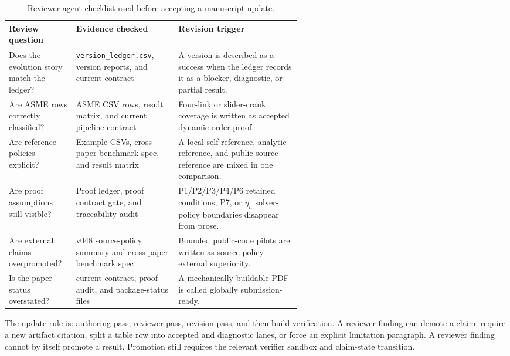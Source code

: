 \documentclass[10pt]{article}
\begin{document}
\begin{table}[H]
\centering
\caption{Reviewer-agent checklist used before accepting a manuscript update.}
\label{tab:review_agent}
\small
\begin{tabularx}{\linewidth}{p{0.23\linewidth}p{0.35\linewidth}Y}
\toprule
\textbf{Review question} & \textbf{Evidence checked} & \textbf{Revision trigger} \\
\midrule
Does the evolution story match the ledger? & \texttt{version\_ledger.csv}, version reports, and current contract & A version is described as a success when the ledger records it as a blocker, diagnostic, or partial result. \\
Are ASME rows correctly classified? & ASME CSV rows, result matrix, and current pipeline contract & Four-link or slider-crank coverage is written as accepted dynamic-order proof. \\
Are reference policies explicit? & Example CSVs, cross-paper benchmark spec, and result matrix & A local self-reference, analytic reference, and public-source reference are mixed in one comparison. \\
Are proof assumptions still visible? & Proof ledger, proof contract gate, and traceability audit & P1/P2/P3/P4/P6 retained conditions, P7, or $\eta_h$ solver-policy boundaries disappear from prose. \\
Are external claims overpromoted? & v048 source-policy summary and cross-paper benchmark spec & Bounded public-code pilots are written as source-policy external superiority. \\
Is the paper status overstated? & current contract, proof audit, and package-status files & A mechanically buildable PDF is called globally submission-ready. \\
\bottomrule
\end{tabularx}
\end{table}

The update rule is: authoring pass, reviewer pass, revision pass, and then
build verification. A reviewer finding can demote a claim, require a new
artifact citation, split a table row into accepted and diagnostic lanes, or
force an explicit limitation paragraph. A reviewer finding cannot by itself
promote a result. Promotion still requires the relevant verifier sandbox and
claim-state transition.
\end{document}
